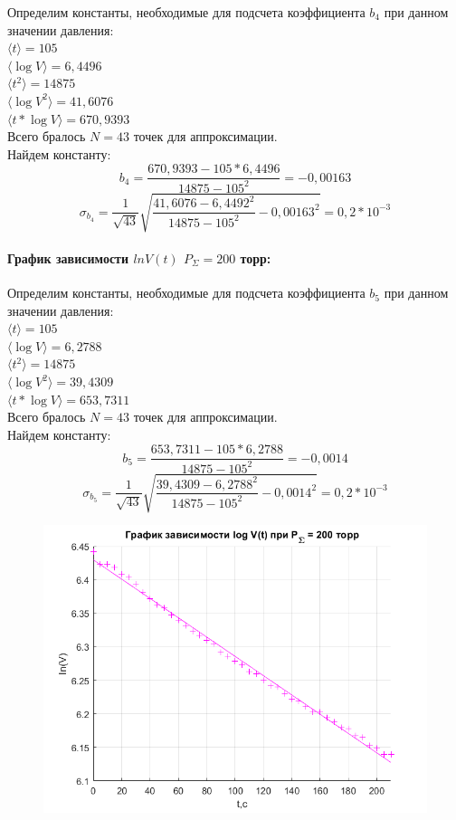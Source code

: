 \documentclass[a4paper,12pt]{article}
\begin{document}
Определим константы, необходимые для подсчета коэффициента $b_4$ при данном значении давления:\\
$\langle t \rangle = 105$\\ 
$\langle \log V \rangle = 6,4496$\\
$\langle t^2 \rangle = 14875$\\
$\langle \log V^2 \rangle = 41,6076$\\
$\langle t*\log V \rangle = 670,9393$\\
Всего бралось $ N = 43$ точек для аппроксимации. \\
Найдем константу:
\begin{equation*}
b_4 =\dfrac{670,9393 - 105*6,4496}{14875 - 105^2} = -0,00163
\end{equation*}
\begin{equation*}
\sigma_{b_4} = \frac{1}{\sqrt{43}}\sqrt{\frac{41,6076 - 6,4492^2}{14875 - 105^2} - 0,00163^2} = 0,2 * 10^{-3}
\end{equation*}
\paragraph{График зависимости $lnV(t)$ $P_{\Sigma} = 200$ торр:}

Определим константы, необходимые для подсчета коэффициента $b_5$ при данном значении давления:\\
$\langle t \rangle = 105$\\ 
$\langle \log V \rangle = 6,2788$\\
$\langle t^2 \rangle = 14875$\\
$\langle \log V^2 \rangle = 39,4309$\\
$\langle t*\log V \rangle = 653,7311$\\
Всего бралось $ N = 43$ точек для аппроксимации. \\
Найдем константу:
\begin{equation*}
b_5 =\dfrac{653,7311 - 105*6,2788}{14875 - 105^2}= -0,0014
\end{equation*}
\begin{equation*}
\sigma_{b_5} = \frac{1}{\sqrt{43}}\sqrt{\frac{39,4309 - 6,2788^2}{14875 - 105^2} - 0,0014^2} = 0,2 * 10^{-3}
\end{equation*}
\begin{figure}[h]
\begin{center}
\includegraphics[width=0.5\linewidth]{gr_200_t.png}
\label{graph_200} 
\end{center}
\end{figure}
\end{document}
